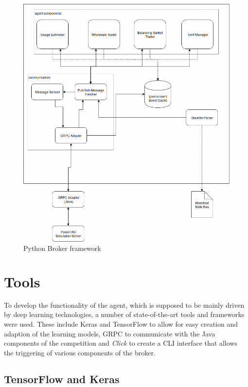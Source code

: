 \begin{figure}[]
    \centering
    \includegraphics[width=0.8\linewidth]{img/Agent.png}
    \caption{Python Broker framework}
    \label{fig:agentframework}
\end{figure}


\section{Tools}

To develop the functionality of the agent, which is supposed to be mainly driven by deep learning technologies, a number
of state-of-the-art tools and frameworks were  used. These include
Keras and TensorFlow to allow for easy creation and adaption of the learning models,
\ac{GRPC} to communicate with the Java components of the competition and
\emph{Click} to create a CLI interface that allows the triggering of various components of the broker.



\subsection{TensorFlow and Keras}%
\label{sub:tensorflow_and_keras}

